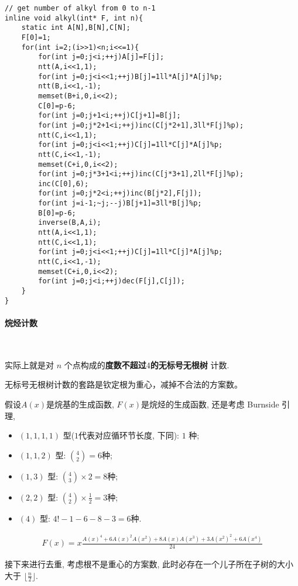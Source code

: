 \documentclass{ctexart}
\begin{document}
\begin{lstlisting}
// get number of alkyl from 0 to n-1
inline void alkyl(int* F, int n){
    static int A[N],B[N],C[N];
    F[0]=1;
    for(int i=2;(i>>1)<n;i<<=1){
        for(int j=0;j<i;++j)A[j]=F[j];
        ntt(A,i<<1,1);
        for(int j=0;j<i<<1;++j)B[j]=1ll*A[j]*A[j]%p;
        ntt(B,i<<1,-1);
        memset(B+i,0,i<<2);
        C[0]=p-6;
        for(int j=0;j+1<i;++j)C[j+1]=B[j];
        for(int j=0;j*2+1<i;++j)inc(C[j*2+1],3ll*F[j]%p);
        ntt(C,i<<1,1);
        for(int j=0;j<i<<1;++j)C[j]=1ll*C[j]*A[j]%p;
        ntt(C,i<<1,-1);
        memset(C+i,0,i<<2);
        for(int j=0;j*3+1<i;++j)inc(C[j*3+1],2ll*F[j]%p);
        inc(C[0],6);
        for(int j=0;j*2<i;++j)inc(B[j*2],F[j]);
        for(int j=i-1;~j;--j)B[j+1]=3ll*B[j]%p;
        B[0]=p-6;
        inverse(B,A,i);
        ntt(A,i<<1,1);
        ntt(C,i<<1,1);
        for(int j=0;j<i<<1;++j)C[j]=1ll*C[j]*A[j]%p;
        ntt(C,i<<1,-1);
        memset(C+i,0,i<<2);
        for(int j=0;j<i;++j)dec(F[j],C[j]);
    }
}
\end{lstlisting}

\paragraph{烷烃计数}\ 

实际上就是对 $n$ 个点构成的\textbf{度数不超过$4$的无标号无根树} 计数.

无标号无根树计数的套路是钦定根为重心，减掉不合法的方案数。

假设$A(x)$是烷基的生成函数, $F(x)$是烷烃的生成函数, 还是考虑 Burnside 引理, 
\begin{itemize}
    \item $(1,1,1,1)$ 型($1$代表对应循环节长度, 下同): $1$ 种; 
    \item $(1,1,2)$ 型: $\binom{4}{2}=6$种;
    \item $(1,3)$ 型: $\binom{4}{3}\times 2=8$种;
    \item $(2,2)$ 型: $\binom{4}{2}\times \frac{1}{2}=3$种;
    \item $(4)$ 型: $4!-1-6-8-3=6$种.
\end{itemize}

\begin{align*}
    F(x)=x\frac{A(x)^4+6A(x)^2A(x^2)+8A(x)A(x^3)+3A(x^2)^2+6A(x^4)}{24}
\end{align*}

接下来进行去重, 考虑根不是重心的方案数, 此时必存在一个儿子所在子树的大小大于 $\lfloor \frac{n}{2} \rfloor$.
\end{document}
